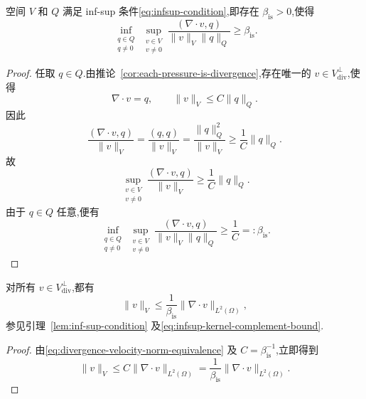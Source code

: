 \begin{theorem}\label{thm:infsup-v-q}
空间 $V$ 和 $Q$ 满足 inf-sup 条件\cref{eq:infsup-condition},即存在 $\beta_{\mathrm{is}}>0$,使得
\begin{equation}\label{eq:infsup-v-q}
  \inf_{\substack{q\in Q\\q\ne0}}
  \sup_{\substack{v\in V\\v\ne0}}
    \frac{(\nabla\cdot v,q)}{\|v\|_V\|q\|_Q}
    \ge\beta_{\mathrm{is}}.
\end{equation}
\end{theorem}
\begin{proof}
任取 $q\in Q$.由推论~\ref{cor:each-pressure-is-divergence},存在唯一的 $v\in V_{\mathrm{div}}^{\perp}$,使得
\[
  \nabla\cdot v=q,\qquad \|v\|_V\le C\|q\|_Q.
\]
因此
\[
  \frac{(\nabla\cdot v,q)}{\|v\|_V}
    =\frac{(q,q)}{\|v\|_V}
    =\frac{\|q\|_Q^2}{\|v\|_V}
    \ge\frac1C\|q\|_Q.
\]
故
\[
  \sup_{\substack{v\in V\\v\ne0}}
    \frac{(\nabla\cdot v,q)}{\|v\|_V}
    \ge\frac1C\|q\|_Q.
\]
由于 $q\in Q$ 任意,便有
\[
  \inf_{\substack{q\in Q\\q\ne0}}
  \sup_{\substack{v\in V\\v\ne0}}
    \frac{(\nabla\cdot v,q)}{\|v\|_V\|q\|_Q}
    \ge\frac1C=:\beta_{\mathrm{is}}.
\]
\end{proof}

\begin{corollary}\label{cor:gradient-by-divergence}
对所有 $v\in V_{\mathrm{div}}^{\perp}$,都有
\begin{equation}\label{eq:gradient-by-divergence}
  \|v\|_V\le\frac1{\beta_{\mathrm{is}}}
                \|\nabla\cdot v\|_{L^2(\Omega)},
\end{equation}
参见引理~\ref{lem:inf-sup-condition} 及\cref{eq:infsup-kernel-complement-bound}.
\end{corollary}
\begin{proof}
由\cref{eq:divergence-velocity-norm-equivalence} 及 $C=\beta_{\mathrm{is}}^{-1}$,立即得到
\[
  \|v\|_V\le C\|\nabla\cdot v\|_{L^2(\Omega)}
    =\frac1{\beta_{\mathrm{is}}}
       \|\nabla\cdot v\|_{L^2(\Omega)}.
\]
\end{proof}

